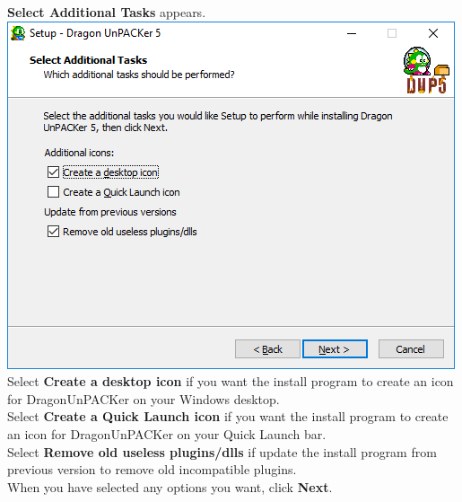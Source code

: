 \documentclass[10pt,a4paper,twoside]{book}
\makeatletter
\def\maxwidth#1{\ifdim\Gin@nat@width>#1 #1\else\Gin@nat@width\fi}
\makeatother
\begin{document}
\begin{enumerate}
\begin{minipage}{\linewidth}
\item \textbf{Select Additional Tasks} appears.\\
\includegraphics[width=\maxwidth{9cm}]{install/007-additional}\\
Select \textbf{Create a desktop icon} if you want the install program to create an icon for
DragonUnPACKer on your Windows desktop.\\
Select \textbf{Create a Quick Launch icon} if you want the install program to create an icon for
DragonUnPACKer on your Quick Launch bar.\\
Select \textbf{Remove old useless plugins/dlls} if update the install program from previous version to remove old incompatible plugins.\\
When you have selected any options you want, click \textbf{Next}.\\
\end{minipage}


\end{enumerate}
\end{document}
